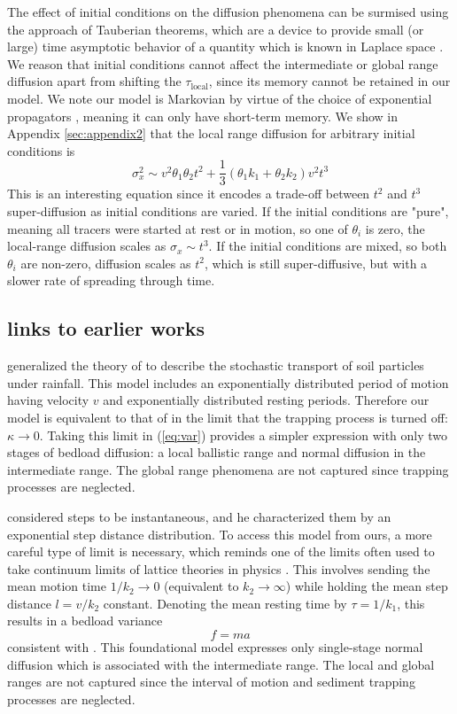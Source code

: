 \documentclass[]{agujournal2018}
\newcommand\be{\begin{equation}}
\newcommand\ee{\end{equation}}
\begin{document}
The effect of initial conditions on the diffusion phenomena can be surmised using the approach of Tauberian theorems, which are a device to provide small (or large) time asymptotic behavior of a quantity which is known in Laplace space \citep[e.g.][]{Weiss1994}.
We reason that initial conditions cannot affect the intermediate or global range diffusion apart from shifting the $\tau_\text{local}$, since its memory cannot be retained in our model.
We note our model is Markovian by virtue of the choice of exponential propagators \citep{Weiss1994}, meaning it can only have short-term memory.
We show in Appendix \ref{sec:appendix2} that the local range diffusion for arbitrary initial conditions is 
\be \sigma_x^2 \sim v^2 \theta_1 \theta_2 t^2  + \frac{1}{3}(\theta_1 k_1 + \theta_2 k_2)v^2t^3\ee
This is an interesting equation since it encodes a trade-off between $t^2$ and $t^3$ super-diffusion as initial conditions are varied.
If the initial conditions are "pure", meaning all tracers were started at rest or in motion, so one of $\theta_i$ is zero, the local-range diffusion scales as $\sigma_x \sim t^3.$
If the initial conditions are mixed, so both $\theta_i$ are non-zero, diffusion scales as $t^2$, which is still super-diffusive, but with a slower rate of spreading through time.

\subsection{links to earlier works}

\citet{Lisle1998} generalized the theory of \citet{Einstein1937} to describe the stochastic transport of soil particles under rainfall.
This model includes an exponentially distributed period of motion having velocity $v$ and exponentially distributed resting periods.
Therefore our model is equivalent to that of \citet{Lisle1998} in the limit that the trapping process is turned off: $\kappa \rightarrow 0$.
Taking this limit in (\ref{eq:var}) provides a simpler expression with only two stages of bedload diffusion: a local ballistic range and normal diffusion in the intermediate range. The global range phenomena are not captured since trapping processes are neglected.

\citet{Einstein1937} considered steps to be instantaneous, and he characterized them by an exponential step distance distribution.
To access this model from ours, a more careful type of limit is necessary, which reminds one of the limits often used to take continuum limits of lattice theories in physics \citep[e.g.][]{Goldstein1980, Weiss1994}.
This involves sending the mean motion time $1/k_2 \rightarrow 0 $ (equivalent to $k_2 \rightarrow \infty$) while holding the mean step distance $l = v/k_2$ constant.
Denoting the mean resting time by $\tau = 1/k_1$, this results in a bedload variance
\be f=ma \ee
consistent with \citet{Einstein1937}.
This foundational model expresses only single-stage normal diffusion which is associated with the intermediate range. 
The local and global ranges are not captured since the interval of motion and sediment trapping processes are neglected.
\end{document}
